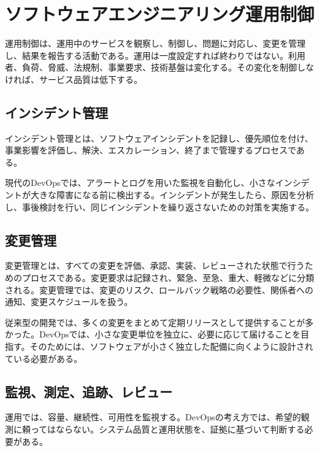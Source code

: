 \documentclass[uplatex,dvipdfmx,a4paper,10pt]{jsarticle}
\begin{document}
\section{ソフトウェアエンジニアリング運用制御}

運用制御は、運用中のサービスを観察し、制御し、問題に対応し、変更を管理し、結果を報告する活動である。運用は一度設定すれば終わりではない。利用者、負荷、脅威、法規制、事業要求、技術基盤は変化する。その変化を制御しなければ、サービス品質は低下する。

\subsection{インシデント管理}

インシデント管理とは、ソフトウェアインシデントを記録し、優先順位を付け、事業影響を評価し、解決、エスカレーション、終了まで管理するプロセスである。

現代のDevOpsでは、アラートとログを用いた監視を自動化し、小さなインシデントが大きな障害になる前に検出する。インシデントが発生したら、原因を分析し、事後検討を行い、同じインシデントを繰り返さないための対策を実施する。

\subsection{変更管理}

変更管理とは、すべての変更を評価、承認、実装、レビューされた状態で行うためのプロセスである。変更要求は記録され、緊急、至急、重大、軽微などに分類される。変更管理では、変更のリスク、ロールバック戦略の必要性、関係者への通知、変更スケジュールを扱う。

従来型の開発では、多くの変更をまとめて定期リリースとして提供することが多かった。DevOpsでは、小さな変更単位を独立に、必要に応じて届けることを目指す。そのためには、ソフトウェアが小さく独立した配備に向くように設計されている必要がある。

\subsection{監視、測定、追跡、レビュー}

運用では、容量、継続性、可用性を監視する。DevOpsの考え方では、希望的観測に頼ってはならない。システム品質と運用状態を、証拠に基づいて判断する必要がある。
\end{document}
